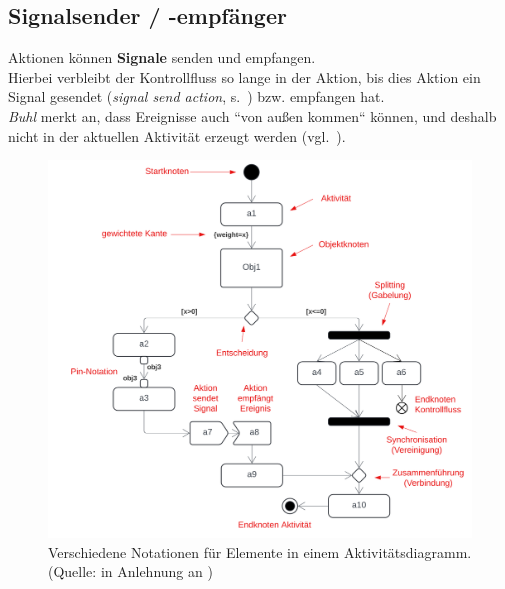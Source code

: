 \subsection{Signalsender / -empfänger}
Aktionen können \textbf{Signale} senden und empfangen.\\
Hierbei verbleibt der Kontrollfluss so lange in der Aktion, bis dies Aktion ein Signal gesendet (\textit{signal send action}, s.~\cite[76]{Buh09}) bzw. empfangen hat.\\
\textit{Buhl} merkt an, dass Ereignisse auch ``von außen kommen`` können, und deshalb nicht in der aktuellen Aktivität erzeugt werden (vgl.~\cite[63]{Buh09}).


\begin{figure}
    \centering
    \includegraphics[scale=0.35]{part three/Aktivitätsdiagramme/img/aktivitätsdiagramm-notation}
    \caption{Verschiedene Notationen für Elemente in einem Aktivitätsdiagramm. (Quelle: in Anlehnung an \cite[326, Abb. 6.9-16]{Bal05})}
    \label{fig:aktivitätsdiagramm-notation}
\end{figure}